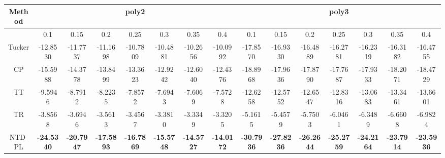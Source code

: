 \begin{tabular}{c|ccccccc|ccccccc}
    \hline
    Method & \multicolumn{7}{c|}{poly2} & \multicolumn{7}{c}{poly3} \\
    \hline
     & 0.1 & 0.15 & 0.2 & 0.25 & 0.3 & 0.35 & 0.4 & 0.1 & 0.15 & 0.2 & 0.25 & 0.3 & 0.35 & 0.4 \\
    \hline
    Tucker & -12.8530 & -11.7737 & -11.1698 & -10.7809 & -10.4881 & -10.2656 & -10.0992 & -17.8570 & -16.9330 & -16.4889 & -16.2781 & -16.2319 & -16.3182 & -16.4755 \\
    CP & -15.5988 & -14.3778 & -13.8499 & -13.3623 & -12.9242 & -12.6040 & -12.4376 & -18.8968 & -17.9636 & -17.8790 & -17.7687 & -17.9333 & -18.2071 & -18.4729 \\
    TT & -9.5946 & -8.7912 & -8.2235 & -7.8572 & -7.6943 & -7.6069 & -7.5728 & -12.6258 & -12.5752 & -12.6547 & -12.8316 & -13.0683 & -13.3461 & -13.6601 \\
    TR & -3.8568 & -3.6946 & -3.5613 & -3.4567 & -3.3810 & -3.3349 & -3.3205 & -5.1615 & -5.4579 & -5.7503 & -6.0461 & -6.3489 & -6.6608 & -6.9824 \\
    \hline
    NTD-PL & \textbf{-24.5340} & \textbf{-20.7947} & \textbf{-17.5893} & \textbf{-16.7869} & \textbf{-15.5748} & \textbf{-14.5727} & \textbf{-14.0172} & \textbf{-30.7936} & \textbf{-27.8236} & \textbf{-26.2644} & \textbf{-25.2759} & \textbf{-24.2164} & \textbf{-23.7914} & \textbf{-23.5936} \\
    \hline
\end{tabular}

